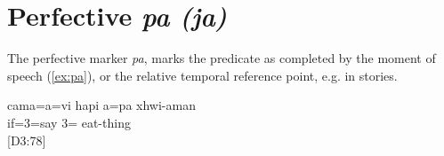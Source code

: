  
 \section{Perfective \textit{pa (ja)} }
  \label{sec:pa ja}
  
The perfective marker \textit{pa}, marks the predicate as completed by the moment of speech (\ref{ex:pa}), or the relative temporal reference point, e.g. in stories. 

\ea \label{ex:pa} 
\gll cama=a=vi hapi a=pa xhwi-aman\\
 if=3=say  3= eat-thing\\
\glt {} {[D3:78]}
\z

